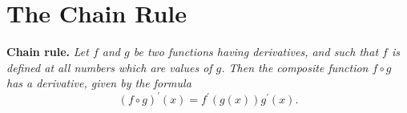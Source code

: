 \section*{The Chain Rule}

\textbf{Chain rule.} \textit{Let $f$ and $g$ be two functions having derivatives, and such that $f$ is defined
  at all numbers which are values of $g$. Then the composite function $f \circ g$ has a derivative, given by
  the formula}
  \[(f \circ g)^\prime(x) = f^\prime(g(x))g^\prime(x).\]
